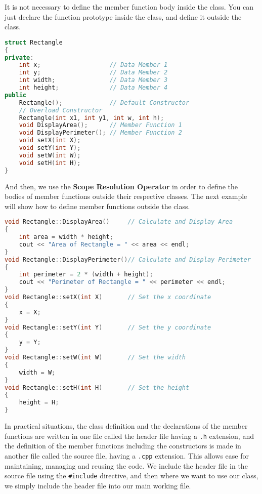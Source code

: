 \documentclass[11pt,fleqn]{book} %
\begin{document}
\noindent It is not necessary to define the member function body inside the class. You can just declare the function prototype inside the class, and define it outside the class.

\begin{lstlisting}[language=C++, caption=Class Definition using the \texttt{struct} keyword in C++]
struct Rectangle
{
private:
    int x;                   // Data Member 1
    int y;                   // Data Member 2
    int width;               // Data Member 3
    int height;              // Data Member 4
public
    Rectangle();             // Default Constructor
    // Overload Constructor
    Rectangle(int x1, int y1, int w, int h);
    void DisplayArea();      // Member Function 1
    void DisplayPerimeter(); // Member Function 2
    void setX(int X);
    void setY(int Y);
    void setW(int W);
    void setH(int H);
}
\end{lstlisting}

\noindent And then, we use the \textbf{Scope Resolution Operator} in order to define the bodies of member functions outside their respective classes. The next example will show how to define member functions outside the class.

\begin{lstlisting}[language=C++, caption=Class Definition using the \texttt{struct} keyword in C++]
void Rectangle::DisplayArea()     // Calculate and Display Area
{
    int area = width * height;
    cout << "Area of Rectangle = " << area << endl;
}
void Rectangle::DisplayPerimeter()// Calculate and Display Perimeter
{
    int perimeter = 2 * (width + height);
    cout << "Perimeter of Rectangle = " << perimeter << endl;
}
void Rectangle::setX(int X)       // Set the x coordinate
{
    x = X;
}
void Rectangle::setY(int Y)       // Set the y coordinate
{
    y = Y;
}
void Rectangle::setW(int W)       // Set the width
{
    width = W;
}
void Rectangle::setH(int H)       // Set the height
{
    height = H;
}
\end{lstlisting}

\noindent In practical situations, the class definition and the declarations of the member functions are written in one file called the header file having a \texttt{.h} extension, and the definition of the member functions including the constructors is made in another file called the source file, having a \texttt{.cpp} extension. This allows ease for maintaining, managing and reusing the code. We include the header file in the source file using the \texttt{\#include} directive, and then where we want to use our class, we simply include the header file into our main working file.
\end{document}
